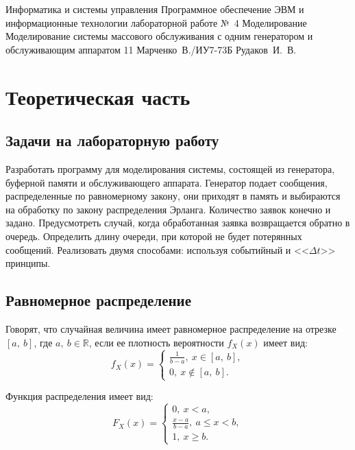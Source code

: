 \documentclass{bmstu}
\begin{document}
\makereporttitle
    {Информатика и системы управления}
    {Программное обеспечение ЭВМ и информационные технологии}
    {лабораторной работе №~4} %
    {Моделирование} %
    {Моделирование системы массового обслуживания с одним генератором и обслуживающим аппаратом} %
    {11} %
    {Марченко~В./ИУ7-73Б} %
    {Рудаков~И.~В.} %

{\centering \maketableofcontents}

\chapter{Теоретическая часть}

\section{Задачи на лабораторную работу}

Разработать программу для моделирования системы, состоящей из генератора, буферной памяти и обслуживающего аппарата. 
Генератор подает сообщения, распределенные по равномерному закону, они
приходят в память и выбираются на обработку по закону распределения Эрланга. 
Количество заявок конечно и задано. 
Предусмотреть случай, когда обработанная заявка возвращается обратно в очередь. 
Определить длину очереди, при которой не будет потерянных сообщений. 
Реализовать двумя способами: используя событийный и <<$\Delta t$>> принципы.

\section{Равномерное распределение}

Говорят, что случайная величина имеет равномерное распределение на отрезке $[a,~b]$, где $a,~b \in \mathbb{R}$, если ее плотность вероятности $f_{X}(x)$ имеет вид:
\begin{equation}
f_{X}(x) = \begin{cases}
	\frac{1}{b - a},~x \in [a,~b], \\
	0,~x \notin [a,~b].
	\end{cases}
\end{equation}

Функция распределения имеет вид:
\begin{equation}
F_{X}(x) = \begin{cases}
	0,~x < a, \\
	\frac{x - a}{b - a},~a \leq x < b, \\
	1,~x \geq b.
	\end{cases}
\end{equation}
\end{document}
